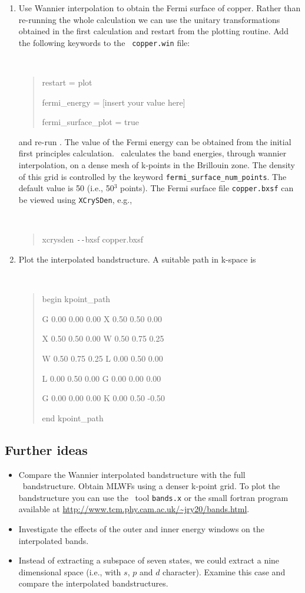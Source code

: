\documentclass[a4paper,11pt,twoside]{article}
\begin{document}
\begin{enumerate}
\item Use Wannier interpolation to obtain the Fermi surface of
  copper. Rather than re-running the whole calculation we can use the
  unitary transformations obtained in the first calculation and restart
  from the plotting routine. Add the following keywords to the {\tt
    copper.win} file:
{\tt
\begin{quote}
restart = plot

fermi\_energy = [insert your value here] 

fermi\_surface\_plot = true
\end{quote} } and re-run \wannier. The value of the Fermi energy can
be obtained from the initial first principles calculation. \wannier\
calculates the band energies, through wannier interpolation, on a
dense mesh of k-points in the Brillouin zone. The density of this grid
is controlled by the keyword {\tt fermi\_surface\_num\_points}. The
default value is 50 (i.e., 50$^3$ points).  The Fermi surface file
{\tt copper.bxsf} can be viewed using {\tt XCrySDen}, e.g.,
%
{\tt
\begin{quote}
xcrysden \texttt{-{}-}bxsf copper.bxsf
\end{quote} }


\item Plot the interpolated bandstructure. A suitable path in k-space is
\smallskip
{\tt
\begin{quote}
begin kpoint\_path

G 0.00  0.00  0.00    X 0.50  0.50  0.00

X 0.50  0.50  0.00    W 0.50  0.75  0.25

W 0.50  0.75  0.25    L 0.00  0.50  0.00

L 0.00  0.50  0.00    G 0.00  0.00  0.00

G 0.00  0.00  0.00    K 0.00  0.50 -0.50
 
end kpoint\_path
\end{quote} }
\end{enumerate}

\subsection*{Further ideas}
\begin{itemize}
\item Compare the Wannier interpolated bandstructure with the full
  \pwscf\ bandstructure. Obtain MLWFs using a denser k-point grid.
To plot the bandstructure you can use the \pwscf\ tool {\tt bands.x} or the small fortran program available at \url{http://www.tcm.phy.cam.ac.uk/~jry20/bands.html}.
\item Investigate the effects of the outer and inner energy windows on
  the interpolated bands. 
\item Instead of extracting a subspace of seven states, we could
  extract a nine dimensional space (i.e., with $s$, $p$ and $d$
  character). Examine this case and compare the interpolated
  bandstructures.
\end{itemize}
\end{document}
